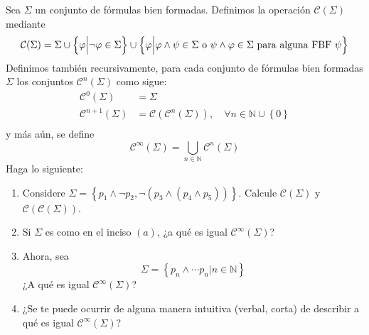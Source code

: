 \documentclass[12pt]{report}
\theoremstyle{largebreak}
\begin{document}
    \begin{excer}
        Sea $\Sigma$ un conjunto de fórmulas bien formadas. Definimos la operación $\mathcal{C}(\Sigma)$ mediante
        \begin{equation*}
            \mathcal{C}(\Sigma)=\Sigma\cup\left\{\varphi\Big|\neg\varphi\in\Sigma \right\}\cup\left\{\varphi\Big|\varphi\land\psi\in\Sigma\textup{ o }\psi\land\varphi\in\Sigma\textup{ para alguna FBF }\psi \right\}
        \end{equation*}
        Definimos también recursivamente, para cada conjunto de fórmulas bien formadas $\Sigma$ los conjuntos $\mathcal{C}^n(\Sigma)$ como sigue:
        \begin{equation*}
            \begin{split}
                \mathcal{C}^0(\Sigma)&=\Sigma\\
                \mathcal{C}^{n+1}(\Sigma)&=\mathcal{C}(\mathcal{C}^n(\Sigma)),\quad\forall n\in\mathbb{N}\cup\left\{0\right\}\\
            \end{split}
        \end{equation*}
        y más aún, se define
        \begin{equation*}
            \mathcal{C}^\infty(\Sigma)=\bigcup_{ n\in\mathbb{N}}\mathcal{C}^n(\Sigma)
        \end{equation*}
        Haga lo siguiente:
        \begin{enumerate}
            \item Considere $\Sigma=\left\{p_1\land\neg p_2,\neg(p_3\land(p_4\land p_5)) \right\}$. Calcule $\mathcal{C}(\Sigma)$ y $\mathcal{C}(\mathcal{C}(\Sigma))$.
            \item Si $\Sigma$ es como en el inciso $(a)$, ¿a qué es igual $\mathcal{C}^\infty(\Sigma)$?
            \item Ahora, sea
            \begin{equation*}
                \Sigma=\left\{p_n\land\cdots p_n\Big|n\in\mathbb{N} \right\}
            \end{equation*}
            ¿A qué es igual $\mathcal{C}^\infty(\Sigma)$?
            \item ¿Se te puede ocurrir de alguna manera intuitiva (verbal, corta) de describir a qué es igual $\mathcal{C}^\infty(\Sigma)$?
        \end{enumerate}
    \end{excer}
    
    \begin{sol}
    \end{sol}
\end{document}
